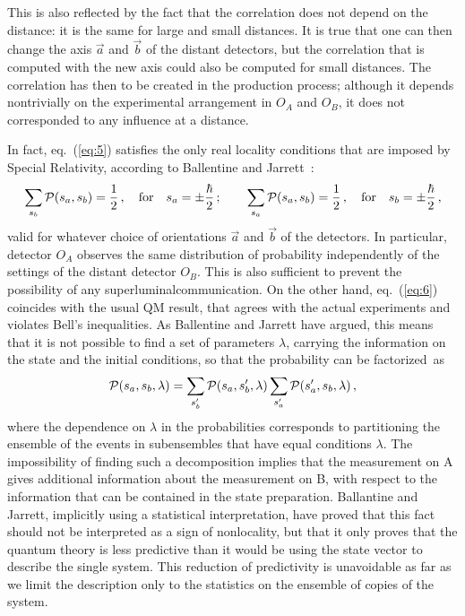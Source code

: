 \documentclass[published]{JHEP3}
\begin{document}
This is also reflected by the fact that the correlation does not
depend on the distance: it is the same for large and small
distances. It is true that one can then change the axis $\vec a$ and
$\vec b$ of the distant detectors, but the correlation that is
computed with the new axis could also be computed for small
distances. The correlation has then to be created in the production
process; although it depends nontrivially on the experimental
arrangement in $O_A$ and $O_B$, it does not corresponded to any
influence at a distance.

In fact, eq.~(\ref{eq:5}) satisfies the only real locality
conditions that are imposed by Special Relativity, according to
Ballentine and Jarrett~\cite{BaJa87}:
\begin{equation}
\sum_{s_b}{\cal P}(s_a,s_b)=\frac12\,, \quad {\rm for} \quad
s_a=\pm\frac\hbar2\,; \qquad 
\sum_{s_a}{\cal P}(s_a,s_b)=\frac12\,,
\quad {\rm for} \quad s_b=\pm\frac\hbar2\,, \label{eq:7}
\end{equation}
valid for whatever choice of orientations $\vec a$ and $\vec b$ of the
detectors. In particular, detector $O_A$ observes the same
distribution of probability independently of the settings of the
distant detector $O_B$. This is also sufficient to prevent the
possibility of any superluminal\pagebreak[3] communication. On the other hand,
eq.~(\ref{eq:6}) coincides with the usual QM result, that agrees with
the actual experiments and violates Bell's inequalities. As Ballentine
and Jarrett have argued, this means that it is not possible to find a
set of parameters $\lambda$, carrying the information on the state and
the initial conditions, so that the probability can be factorized~as
\begin{equation}
{\cal P}(s_a,s_b,\lambda)=\sum_{s'_b}{\cal P}(s_a,s'_b,\lambda)
\sum_{s'_a}{\cal P}(s'_a,s_b,\lambda)\,,
\end{equation}
where the dependence on $\lambda$ in the probabilities corresponds
to partitioning the ensemble of the events in subensembles that
have equal conditions $\lambda$. The impossibility of finding such
a decomposition implies that the measurement on A gives additional
information about the measurement on B, with respect to the
information that can be contained in the state preparation.
Ballantine and Jarrett, implicitly using a statistical
interpretation, have proved that this fact should not be
interpreted as a sign of nonlocality, but that it only proves that
the quantum theory is less predictive than it would be using the
state vector to describe the single system. This reduction of
predictivity is unavoidable as far as we limit the description
only to the statistics on the ensemble of copies of the system.
\end{document}

